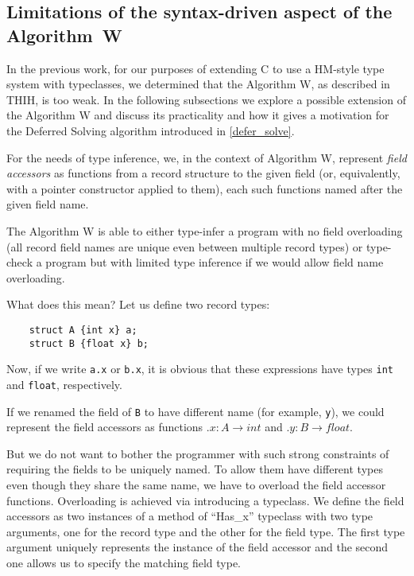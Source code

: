 \subsection{Limitations of the syntax-driven aspect of the Algorithm~W}
\label{ex_structs}

In the previous work, for our purposes of extending C to use a HM-style type system with typeclasses, we determined that the Algorithm W, as described in THIH, is too weak. In the following subsections we explore a possible extension of the Algorithm W and discuss its practicality and how it gives a motivation for the Deferred Solving algorithm introduced in \cref{defer_solve}.

For the needs of type inference, we, in the context of Algorithm W, represent \emph{field accessors} as functions from a record structure to the given field (or, equivalently, with a pointer constructor applied to them), each such functions named after the given field name.

The Algorithm W is able to either type-infer a program with no field overloading (all record field names are unique even between multiple record types) or type-check a program but with limited type inference if we would allow field name overloading.

What does this mean? Let us define two record types:

\begin{lstlisting}
    struct A {int x} a;
    struct B {float x} b;
\end{lstlisting}

Now, if we write \lstinline{a.x} or \lstinline{b.x}, it is obvious that these expressions have types \lstinline{int} and \lstinline{float}, respectively.

If we renamed the field of \lstinline{B} to have different name (for example, \lstinline{y}), we could represent the field accessors as functions $.x : A \to int$ and $.y : B \to float$.

But we do not want to bother the programmer with such strong constraints of requiring the fields to be uniquely named. To allow them have different types even though they share the same name, we have to overload the field accessor functions. Overloading is achieved via introducing a typeclass. We define the field accessors as two instances of a method  of ``Has\_x'' typeclass with two type arguments, one for the record type and the other for the field type. The first type argument uniquely represents the instance of the field accessor and the second one allows us to specify the matching field type.

